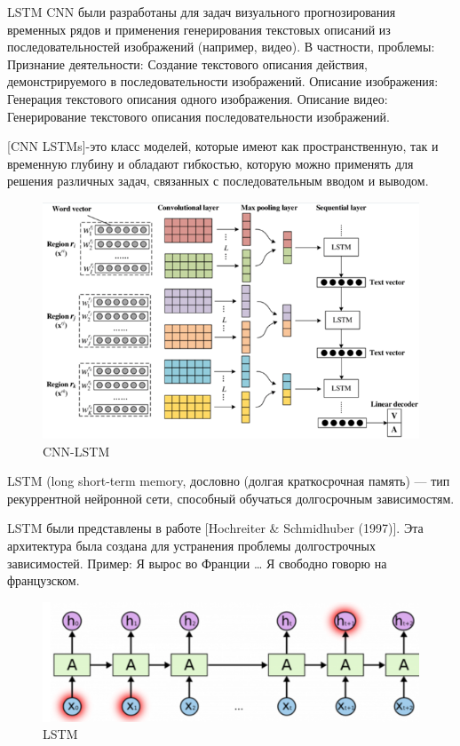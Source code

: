\documentclass{article}
\begin{document}
LSTM CNN были разработаны для задач визуального прогнозирования временных рядов и применения генерирования текстовых описаний из последовательностей изображений (например, видео). В частности, проблемы:
Признание деятельности: Создание текстового описания действия, демонстрируемого в последовательности изображений.
Описание изображения: Генерация текстового описания одного изображения.
Описание видео: Генерирование текстового описания последовательности изображений.

[CNN LSTMs]-это класс моделей, которые имеют как пространственную, так и временную глубину и обладают гибкостью, которую можно применять для решения различных задач, связанных с последовательным вводом и выводом.


\begin{figure}[!tbh]
    \centering
    \includegraphics[width=0.9\linewidth]{CNN-LSTM.png}
    \caption{CNN-LSTM}
    \label{fig:circle}
\end{figure}

LSTM (long short-term memory, дословно (долгая краткосрочная память) — тип рекуррентной нейронной сети, способный обучаться долгосрочным зависимостям. 

LSTM были представлены в работе [Hochreiter & Schmidhuber (1997)]. Эта архитектура была создана для устранения проблемы долгострочных зависимостей. Пример: Я вырос во Франции … Я свободно говорю на французском.

\begin{figure}[!tbh]
    \centering
    \includegraphics[width=0.9\linewidth]{2.png}
    \caption{LSTM}
    \label{fig:circle}
\end{figure}
\end{document}
